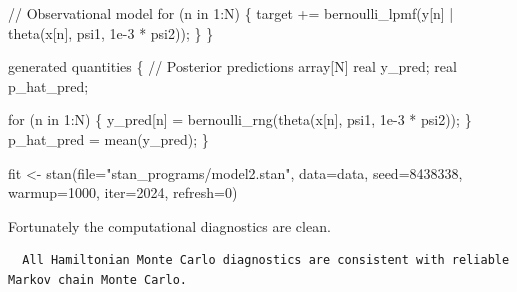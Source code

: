 \documentclass[
  letterpaper,
  DIV=11,
  numbers=noendperiod]{scrartcl}
\newenvironment{Shaded}{\begin{snugshade}}{\end{snugshade}}
\newcommand{\AttributeTok}[1]{\textcolor[rgb]{0.40,0.45,0.13}{#1}}
\newcommand{\CommentTok}[1]{\textcolor[rgb]{0.37,0.37,0.37}{#1}}
\newcommand{\ControlFlowTok}[1]{\textcolor[rgb]{0.00,0.23,0.31}{#1}}
\newcommand{\DataTypeTok}[1]{\textcolor[rgb]{0.68,0.00,0.00}{#1}}
\newcommand{\DecValTok}[1]{\textcolor[rgb]{0.68,0.00,0.00}{#1}}
\newcommand{\FloatTok}[1]{\textcolor[rgb]{0.68,0.00,0.00}{#1}}
\newcommand{\FunctionTok}[1]{\textcolor[rgb]{0.28,0.35,0.67}{#1}}
\newcommand{\KeywordTok}[1]{\textcolor[rgb]{0.00,0.23,0.31}{#1}}
\newcommand{\NormalTok}[1]{\textcolor[rgb]{0.00,0.23,0.31}{#1}}
\newcommand{\OtherTok}[1]{\textcolor[rgb]{0.00,0.23,0.31}{#1}}
\newcommand{\SpecialCharTok}[1]{\textcolor[rgb]{0.37,0.37,0.37}{#1}}
\newcommand{\StringTok}[1]{\textcolor[rgb]{0.13,0.47,0.30}{#1}}
\begin{document}
\begin{codelisting}
\begin{Shaded}
\begin{Highlighting}[]
  \CommentTok{// Observational model}
  \ControlFlowTok{for}\NormalTok{ (n }\ControlFlowTok{in} \DecValTok{1}\NormalTok{:N) \{}
    \KeywordTok{target +=}\NormalTok{ bernoulli\_lpmf(y[n] | theta(x[n], psi1, }\FloatTok{1e{-}3}\NormalTok{ * psi2));}
\NormalTok{  \}}
\NormalTok{\}}

\KeywordTok{generated quantities}\NormalTok{ \{}
  \CommentTok{// Posterior predictions}
  \DataTypeTok{array}\NormalTok{[N] }\DataTypeTok{real}\NormalTok{ y\_pred;}
  \DataTypeTok{real}\NormalTok{ p\_hat\_pred;}

  \ControlFlowTok{for}\NormalTok{ (n }\ControlFlowTok{in} \DecValTok{1}\NormalTok{:N) \{}
\NormalTok{    y\_pred[n] = bernoulli\_rng(theta(x[n], psi1, }\FloatTok{1e{-}3}\NormalTok{ * psi2));}
\NormalTok{  \}}
\NormalTok{  p\_hat\_pred = mean(y\_pred);}
\NormalTok{\}}
\end{Highlighting}
\end{Shaded}

\end{codelisting}

\begin{Shaded}
\begin{Highlighting}[]
\NormalTok{fit }\OtherTok{\textless{}{-}} \FunctionTok{stan}\NormalTok{(}\AttributeTok{file=}\StringTok{"stan\_programs/model2.stan"}\NormalTok{,}
            \AttributeTok{data=}\NormalTok{data, }\AttributeTok{seed=}\DecValTok{8438338}\NormalTok{,}
            \AttributeTok{warmup=}\DecValTok{1000}\NormalTok{, }\AttributeTok{iter=}\DecValTok{2024}\NormalTok{, }\AttributeTok{refresh=}\DecValTok{0}\NormalTok{)}
\end{Highlighting}
\end{Shaded}

Fortunately the computational diagnostics are clean.

\begin{Shaded}
\end{Shaded}

\begin{verbatim}
  All Hamiltonian Monte Carlo diagnostics are consistent with reliable
Markov chain Monte Carlo.
\end{verbatim}
\end{document}
